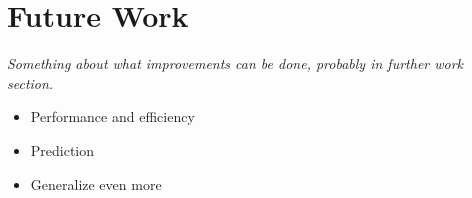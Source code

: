 
\chapter{Future Work}

\textit{Something about what improvements can be done, probably in further work section.}

\begin{itemize}
    \item Performance and efficiency
    \item Prediction
    \item Generalize even more
\end{itemize}

\cleardoublepage